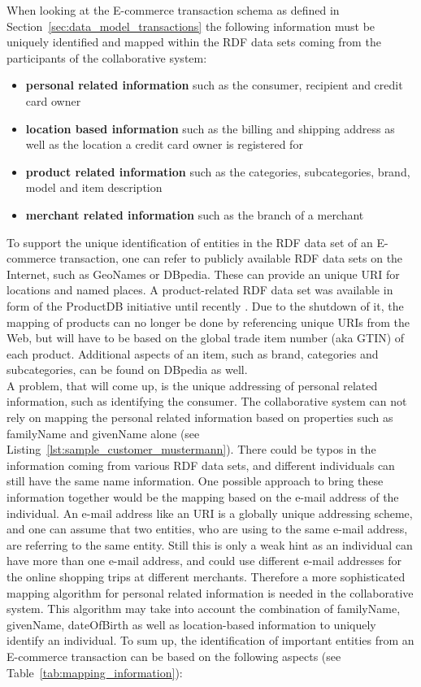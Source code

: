 When looking at the \gls{E-commerce} transaction schema as defined in Section~\ref{sec:data_model_transactions} the following information must be uniquely identified and mapped within the \gls{RDF} data sets coming from the participants of the collaborative system: \@

\begin{itemize}
	\item \textbf{personal related information} such as the consumer, recipient and credit card owner
	\item \textbf{location based information} such as the billing and shipping address as well as the location a credit card owner is registered for
	\item \textbf{product related information} such as the categories, subcategories, brand, model and item description
	\item \textbf{merchant related information} such as the branch of a merchant
\end{itemize}

To support the unique identification of entities in the \gls{RDF} data set of an \gls{E-commerce} transaction, one can refer to publicly available \gls{RDF} data sets on the Internet, such as GeoNames or DBpedia. These can provide an unique \gls{URI} for locations and named places. A product-related \gls{RDF} data set was available in form of the ProductDB initiative until recently \citep{bouzidi2014product}. Due to the shutdown of it, the mapping of products can no longer be done by referencing unique \gls{URI}s from the Web, but will have to be based on the global trade item number (aka \gls{GTIN}) of each product. Additional aspects of an item, such as brand, categories and subcategories, can be found on DBpedia as well. \\

A problem, that will come up, is the unique addressing of personal related information, such as identifying the consumer. The collaborative system can not rely on mapping the personal related information based on properties such as familyName and givenName alone (see Listing~\ref{lst:sample_customer_mustermann}). There could be typos in the information coming from various \gls{RDF} data sets, and different individuals can still have the same name information. One possible approach to bring these information together would be the mapping based on the e-mail address of the individual. An e-mail address like an \gls{URI} is a globally unique addressing scheme, and one can assume that two entities, who are using to the same e-mail address, are referring to the same entity. Still this is only a weak hint as an individual can have more than one e-mail address, and could use different e-mail addresses for the online shopping trips at different merchants. Therefore a more sophisticated mapping algorithm for personal related information is needed in the collaborative system. This algorithm may take into account the combination of familyName, givenName, dateOfBirth as well as location-based information to uniquely identify an individual. To sum up, the identification of important entities from an \gls{E-commerce} transaction can be based on the following aspects (see Table~\ref{tab:mapping_information}): \@

